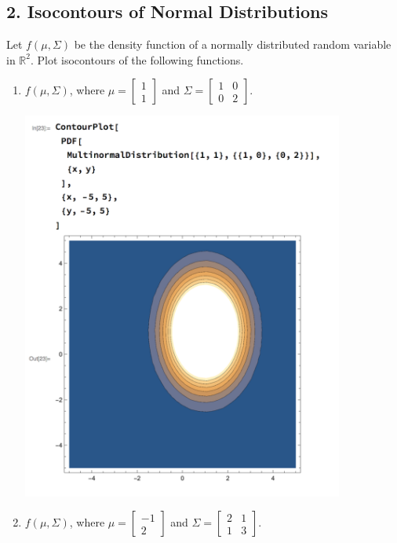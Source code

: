 \documentclass{article}
\renewcommand{\R}{\mathbb{R}}
\begin{document}
\subsection*{2. Isocontours of Normal Distributions}
Let $f(\mu, \Sigma)$ be the density function of a normally distributed random variable in $\R^2$. Plot isocontours of the following functions.
\begin{enumerate}[label=(\alph*)]
    \item $f(\mu, \Sigma)$, where $\mu = \begin{bmatrix}1 \\ 1 \end{bmatrix}$ and $\Sigma = \begin{bmatrix} 1 & 0  \\ 0 & 2 \end{bmatrix}$.
    \begin{mdframed}
      \includegraphics[width=300pt]{img/hw03_2a.png}
    \end{mdframed}
    \newpage
    \item $f(\mu, \Sigma)$, where $\mu = \begin{bmatrix}-1 \\ 2 \end{bmatrix}$ and $\Sigma = \begin{bmatrix} 2 & 1  \\ 1 & 3 \end{bmatrix}$.

\end{enumerate}
\end{document}
